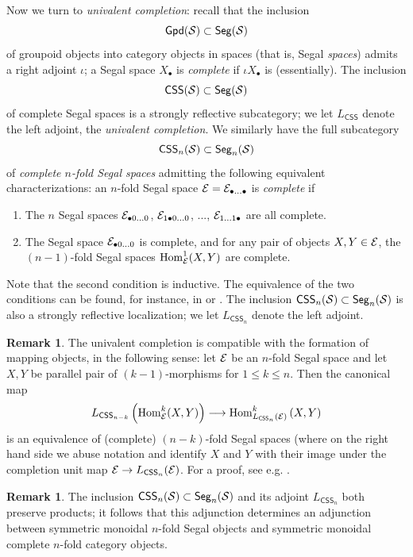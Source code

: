\documentclass[10pt, reqno, twoside
, final
]{amsart}
\numberwithin{equation}{subsection}%
\theoremstyle{definition}
\theoremstyle{definition}
\theoremstyle{definition}
\theoremstyle{definition}
\theoremstyle{definition}
\theoremstyle{definition}
\theoremstyle{definition}
\theoremstyle{definition}
\theoremstyle{definition}
\theoremstyle{plain}
\theoremstyle{definition}
\theoremstyle{plain}
\theoremstyle{definition}
\theoremstyle{plain}
\theoremstyle{definition}
\newtheorem{rmk}[defn]{Remark}
\theoremstyle{definition}
\theoremstyle{plain}
\theoremstyle{plain}
\theoremstyle{definition}
\theoremstyle{plain}
\theoremstyle{plain}
\theoremstyle{plain}
\begin{document}
Now we turn to \emph{univalent completion}: recall that the inclusion 
\[ \mathsf{Gpd}(\mathcal{S})\subset\mathsf{Seg}(\mathcal{S})  \]
of groupoid objects into category objects in spaces (that is, Segal \emph{spaces}) admits a right adjoint $\iota$; a Segal space $X_{\bullet}$ is \emph{complete} if $\iota X_{\bullet}$ is (essentially). The inclusion 
\[ \mathsf{CSS}(\mathcal{S})\subset \mathsf{Seg}(\mathcal{S})  \]
of complete Segal spaces is a strongly reflective subcategory; we let $L_{\mathsf{CSS}}$ denote the left adjoint, the \emph{univalent completion}. We similarly have the full subcategory 
\[ \mathsf{CSS}_n(\mathcal{S})\subset \mathsf{Seg}_n(\mathcal{S})  \]
of \emph{complete $n$-fold Segal spaces} admitting the following equivalent characterizations: an $n$-fold Segal space $\mathcal{E}=\mathcal{E}_{\bullet\ldots\bullet}$ is \emph{complete} if 
\begin{enumerate}
    \item The $n$ Segal spaces $\mathcal{E}_{\bullet0\ldots 0}$, $\mathcal{E}_{1\bullet 0\ldots 0}$, ..., $\mathcal{E}_{1\ldots 1\bullet}$ are all complete. 
    \item The Segal space $\mathcal{E}_{\bullet 0\ldots 0}$ is complete, and for any pair of objects $X,Y\in\mathcal{E}$, the $(n-1)$-fold Segal spaces $\mathrm{Hom}^1_{\mathcal{E}}(X,Y)$ are complete.  
\end{enumerate}
Note that the second condition is inductive. The equivalence of the two conditions can be found, for instance, in \cite[Lemma 2.8]{JFS} or \cite[Section 7]{Haugseng-iteratedspans}. The inclusion $ \mathsf{CSS}_n(\mathcal{S})\subset \mathsf{Seg}_n(\mathcal{S}) $ is also a strongly reflective localization; we let $L_{\mathsf{CSS}_n}$ denote the left adjoint.
\begin{rmk}
The univalent completion is compatible with the formation of mapping objects, in the following sense: let $\mathcal{E}$ be an $n$-fold Segal space and let $X,Y$ be parallel pair of $(k-1)$-morphisms for $1\leq k\leq n$. Then the canonical map
\[ L_{\mathsf{CSS}_{n-k}}\left(\mathrm{Hom}_{\mathcal{E}}^k(X,Y)\right)  \longrightarrow \mathrm{Hom}^k_{L_{\mathsf{CSS}_n}(\mathcal{E})}\left(X,Y\right)  \]
is an equivalence of (complete) $(n-k)$-fold Segal spaces (where on the right hand side we abuse notation and identify $X$ and $Y$ with their image under the completion unit map $\mathcal{E}\rightarrow L_{\mathsf{CSS}_n}(\mathcal{E})$. For a proof, see e.g. \cite[Lemma 5.50]{HaugsengEn}.
\end{rmk}
\begin{rmk}
The inclusion $\mathsf{CSS}_n(\mathcal{S})\subset \mathsf{Seg}_n(\mathcal{S})$ and its adjoint $L_{\mathsf{CSS}_n}$ both preserve products; it follows that this adjunction determines an adjunction between symmetric monoidal $n$-fold Segal objects and symmetric monoidal complete $n$-fold category objects. 
\end{rmk}
\end{document}
